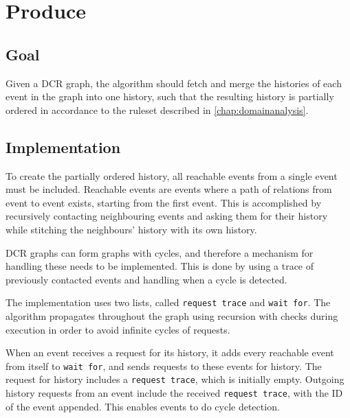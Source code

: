 
\section{Produce}
\subsection{Goal} %
Given a DCR graph, the algorithm should fetch and merge the histories of each event in the graph into one history, such that the resulting history is partially ordered in accordance to the ruleset described in \autoref{chap:domainanalysis}. 


\subsection{Implementation} %
To create the partially ordered history, all reachable events from a single event must be included. Reachable events are events where a path of relations from event to event exists, starting from the first event. This is accomplished by recursively contacting neighbouring events and asking them for their history while stitching the neighbours' history with its own history. 

\newpar DCR graphs can form graphs with cycles, and therefore a mechanism for handling these needs to be implemented. This is done by using a trace of previously contacted events and handling when a cycle is detected.

\newpar The implementation uses two lists, called \texttt{request trace} and \texttt{wait for}.
The algorithm propagates throughout the graph using recursion with checks during execution in order to avoid infinite cycles of requests.

\newpar When an event receives a request for its history, it adds every reachable event from itself to \texttt{wait for}, and sends requests to these events for history. The request for history includes a \texttt{request trace}, which is initially empty. Outgoing history requests from an event include the received \texttt{request trace}, with the ID of the event appended. This enables events to do cycle detection.

